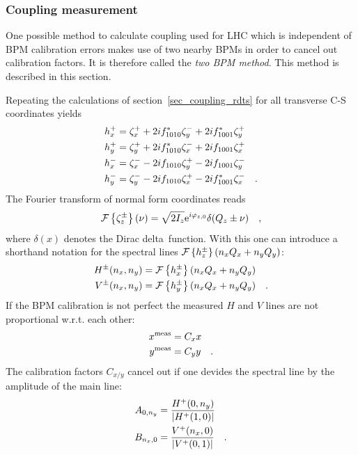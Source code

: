 \subsubsection{Coupling measurement}
\label{sec_coupling_measurement}

One possible method to calculate coupling used for LHC which is independent of BPM calibration errors
makes use of two nearby BPMs in order to cancel out calibration factors. It is therefore called
the \emph{two BPM method}. This method is described in this section.

Repeating the calculations of section~\ref{sec_coupling_rdts} for all transverse C-S coordinates yields
%
\begin{align}
    h_x^+ &= \zeta_x^+ + 2if_{1010}^* \zeta_y^- + 2if_{1001}^*\zeta_y^+  \notag\\  
    h_y^+ &= \zeta_y^+ + 2if_{1010}^* \zeta_x^- + 2i{f_{1001}}\zeta_x^+   \notag\\ 
    h_x^- &= \zeta_x^- - 2i{f_{1010}} \zeta_y^+ - 2i{f_{1001}}\zeta_y^-   \notag\\ 
    h_y^- &= \zeta_y^- - 2i{f_{1010}} \zeta_x^+ - 2if_{1001}^*\zeta_x^-    
    \quad .
    \label{eq_hxpm_hypm}
\end{align}
%
The Fourier transform of normal form coordinates reads
%
\begin{equation}
    \mathcal{F} \left\{ \zeta_z^\pm \right\}(\nu) = \sqrt{2I_z}\text{e}^{i\varphi_{z,0}} \delta(Q_z \pm \nu)
    \quad ,
\end{equation}
%
where $\delta(x)$ denotes the Dirac delta~function.
With this one can introduce a shorthand notation for the spectral lines $\mathcal{F} \left\{ h_z^\pm \right\}(n_xQ_x+n_yQ_y)$:
%
\begin{align}
    H^\pm(n_x,n_y) &= \mathcal{F} \left\{ h_x^\pm \right\}(n_xQ_x+n_yQ_y) \notag\\
    V^\pm(n_x,n_y) &= \mathcal{F} \left\{ h_y^\pm \right\}(n_xQ_x+n_yQ_y) 
    \quad .
\end{align}
%
If the BPM calibration is not perfect the measured $H$ and $V$ lines are not proportional w.r.t. each other:
\newcommand{\meas}{^\text{meas}}
%
\begin{align}
   x\meas &= C_x x \notag \\ 
   y\meas &= C_y y
   \fstop
\end{align}
%
The calibration factors $C_{x/y}$ cancel out if one devides the spectral line by the amplitude of
the main line:
%
\begin{align}
    A_{0,n_y} &= \frac{H^+(0,n_y)}{\left|H^+(1,0)\right|} \notag \\
    B_{n_x,0} &= \frac{V^+(n_x,0)}{\left|V^+(0,1)\right|} 
    \quad .
\end{align}
